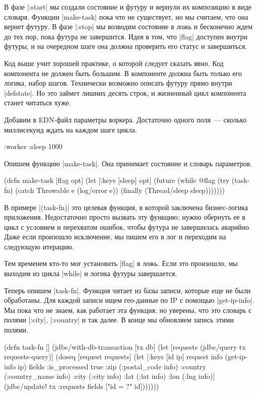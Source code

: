 В фазе \spverb|:start| мы создали состояние и футуру и вернули их композицию в виде
словаря. Функции \spverb|make-task| пока что не существует, но мы считаем, что она
вернет футуру. В фазе \spverb|:stop| мы возводим состояние в ложь и бесконечно ждем до
тех пор, пока футура не завершится. Идея в том, что \spverb|flag| доступен внутри
футуры, и на очередном шаге она должна проверить его статус и завершиться.

Код выше учит хорошей практике, о которой следует сказать явно. Код компонента
не должен быть большим. В компоненте должна быть только его логика, набор
шагов. Технически возможно описать футуру прямо внутри \spverb|defstate|. Но это займет
лишних десять строк, и жизненный цикл компонента станет читаться хуже.

Добавим в EDN-файл параметры воркера. Достаточно одного поля~--- сколько
миллисекунд ждать на каждом шаге цикла.

\begin{code}
{:worker {:sleep 1000}}
\end{code}

Опишем функцию \spverb|make-task|. Она принимает состояние и словарь параметров.

\begin{code}
(defn make-task
  [flag opt]
  (let [{:keys [sleep]} opt]
    (future
      (while @flag
        (try
          (task-fn)
          (catch Throwable e
            (log/error e))
          (finally
            (Thread/sleep sleep)))))))
\end{code}

В примере \spverb|(task-fn)| это целевая функция, в которой заключена бизнес-логика
приложения. Недостаточно просто вызвать эту функцию; нужно обернуть ее в цикл с
условием и перехватом ошибок, чтобы футура не завершилась аварийно. Даже если
произошло исключение, мы пишем его в лог и переходим на следующую итерацию.

Тем временем кто-то мог установить \spverb|flag| в ложь. Если это произошло, мы выходим
из цикла \spverb|while| и логика футуры завершается.

Теперь опишем \spverb|task-fn|. Функция читает из базы записи, которые еще не были
обработаны. Для каждой записи ищем гео-данные по IP с помощью \spverb|get-ip-info|. Мы
пока что не знаем, как работает эта функция, но уверены, что это словарь с
полями \spverb|:city|, \spverb|:country| и так далее. В конце мы обновляем запись этими
полями.

\begin{code}
(defn task-fn
  []
  (jdbc/with-db-transaction [tx db]
    (let [requests (jdbc/query tx requests-query)]
      (doseq [request requests]
        (let [{:keys [id ip]} request
              info (get-ip-info ip)
              fields {:is_processed true
                      :zip (:postal_code info)
                      :country (:country_name info)
                      :city (:city info)
                      :lat (:lat info)
                      :lon (:lng info)}]
          (jdbc/update! tx :requests
                        fields
                        ["id = ?" id]))))))
\end{code}

